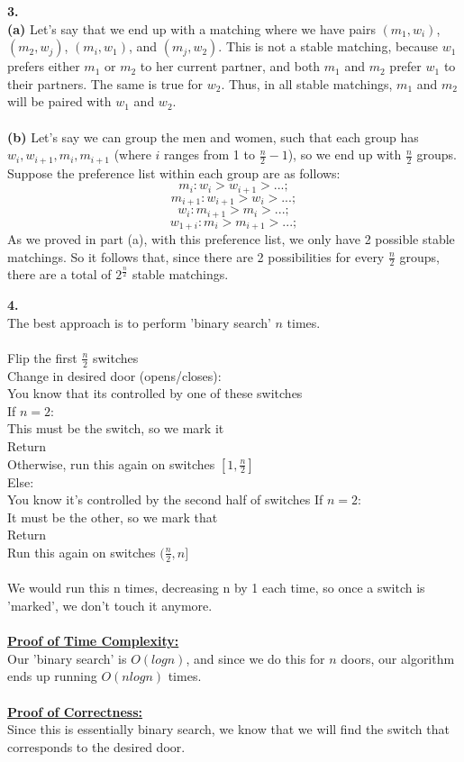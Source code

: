 \documentclass[10pt, letterpaper]{report}
\newcommand\tab[1][1cm]{\hspace*{#1}}
\begin{document}
\newpage
\noindent \large{\textbf{3.} } \\
\textbf{(a)} Let's say that we end up with a matching where we have pairs $(m_1, w_i)$, $(m_2, w_j)$, $(m_i, w_1)$, and $(m_j, w_2)$. This is not a stable matching, because $w_1$ prefers either $m_1$ or $m_2$ to her current partner, and both $m_1$ and $m_2$ prefer $w_1$ to their partners. The same is true for $w_2$. Thus, in all stable matchings, $m_1$ and $m_2$ will be paired with $w_1$ and $w_2$. \\
\\
\textbf{(b)} Let's say we can group the men and women, such that each group has $w_i, w_{i+1}, m_i, m_{i+1}$ (where $i$ ranges from 1 to $\frac{n}{2} - 1$), so we end up with \(\frac{n}{2}\) groups. Suppose the preference list within each group are as follows:
\[m_i: w_i > w_{i+1} > ... ;\]
\[m_{i+1}: w_{i+1} > w_i > ... ;\]
\[w_i: m_{i+1} > m_i > ... ;\]
\[w_{1+i}: m_i > m_{i+1} > ... ; \]
As we proved in part (a), with this preference list, we only have 2 possible stable matchings. So it follows that, since there are 2 possibilities for every \(\frac{n}{2}\) groups, there are a total of \(2^{\frac{n}{2}}\) stable matchings.

\newpage
\noindent \large{\textbf{4.} } \\
The best approach is to perform 'binary search' $n$ times. \\
\\
Flip the first \(\frac{n}{2}\) switches\\
\tab Change in desired door (opens/closes):\\
\tab\tab You know that its controlled by one of these switches\\
\tab\tab If $n=2$:\\
\tab\tab\tab This must be the switch, so we mark it\\
\tab\tab\tab Return\\
\tab\tab Otherwise, run this again on switches $[1, \frac{n}{2}]$\\
\tab Else:\\
\tab\tab You know it's controlled by the second half of switches
\tab\tab If $n=2$:\\
\tab\tab\tab It must be the other, so we mark that\\
\tab\tab\tab Return\\
\tab\tab  Run this again on switches $(\frac{n}{2}, n]$\\
\\
We would run this n times, decreasing n by 1 each time, so once a switch is 'marked', we don't touch it anymore.\\
\\
\textbf{\underline{Proof of Time Complexity:}}\\
Our 'binary search' is $O(logn)$,  and since we do this for $n$ doors, our algorithm ends up running $O(nlogn)$ times.\\
\\
\textbf{\underline{Proof of Correctness:}}\\
Since this is essentially binary search, we know that we will find the switch that corresponds to the desired door. 
\end{document}
